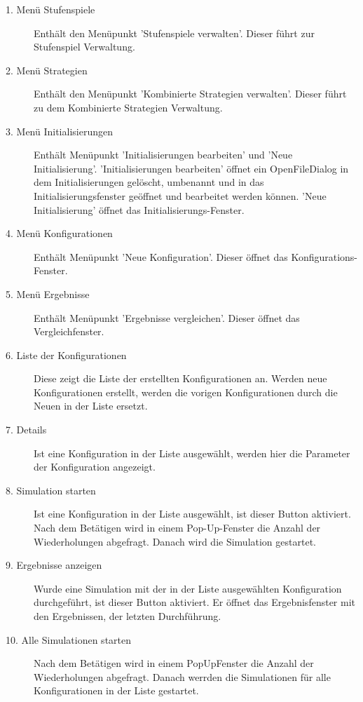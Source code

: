 \begin{description}


\item[1. Menü Stufenspiele] Enthält den Menüpunkt 'Stufenspiele verwalten'. Dieser führt zur Stufenspiel Verwaltung.

\item[2. Menü Strategien] Enthält den Menüpunkt 'Kombinierte Strategien verwalten'. Dieser führt zu dem Kombinierte Strategien Verwaltung.

\item[3. Menü Initialisierungen] Enthält Menüpunkt 'Initialisierungen bearbeiten' und 'Neue Initialisierung'. 'Initialisierungen bearbeiten' öffnet ein OpenFileDialog in dem Initialisierungen gelöscht, umbenannt und in das Initialisierungsfenster geöffnet und bearbeitet werden können. 'Neue Initialisierung' öffnet das Initialisierungs-Fenster.

\item[4. Menü Konfigurationen] Enthält Menüpunkt 'Neue Konfiguration'. Dieser öffnet das Konfigurations-Fenster.

\item[5. Menü Ergebnisse] Enthält Menüpunkt 'Ergebnisse vergleichen'. Dieser öffnet das Vergleichfenster.

\item[6. Liste der Konfigurationen] Diese zeigt die Liste der erstellten Konfigurationen an. Werden neue Konfigurationen erstellt, werden die vorigen Konfigurationen durch die Neuen in der Liste ersetzt.

\item[7. Details] Ist eine Konfiguration in der Liste ausgewählt, werden hier die Parameter der Konfiguration angezeigt.

\item[8. Simulation starten] Ist eine Konfiguration in der Liste ausgewählt, ist dieser Button aktiviert. Nach dem Betätigen wird in einem Pop-Up-Fenster die Anzahl der Wiederholungen abgefragt. Danach wird die Simulation gestartet.

\item[9. Ergebnisse anzeigen] Wurde eine Simulation mit der in der Liste ausgewählten Konfiguration durchgeführt, ist dieser Button aktiviert. Er öffnet das Ergebnisfenster mit den Ergebnissen, der letzten Durchführung.

\item[10. Alle Simulationen starten] Nach dem Betätigen wird in einem PopUpFenster die Anzahl der Wiederholungen abgefragt. Danach werrden die Simulationen für alle Konfigurationen in der Liste gestartet.

\end{description}

